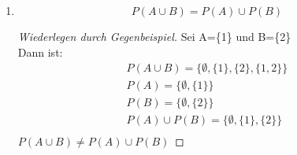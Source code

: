 \documentclass{article}
\begin{document}
\begin{enumerate}[label=\arabic*)]
\begin{enumerate}[label=\alph*)]
\begin{proof}[Beweis durch Fallunterscheidung]
                        Fall 2: $A = B$
                        \begin{gather*}
                            A \cap B = A = B \\
                            P(A \cap B) = P(A) = P(B)
                            = P(A) \cap P(B)
                        \end{gather*} \hfill \checkmark

                        Fall 3: $(A \cap B) \subset A \wedge (A \cap B) \subset B$
                        \begin{gather*}
                            P(A \cap B) = \{C |C \subset A \cap B\} \\
                            P(A) = \{A^{*} | A^{*} \subset A \} \\
                            P(B) = \{B^{*} | B \subset B \} \\
                        \end{gather*}


                    \end{proof}
                    \pagebreak
              \item \begin{equation}
                        P(A \cup B) =P(A) \cup P(B)
                    \end{equation}
                    \begin{proof}[Wiederlegen durch Gegenbeispiel]
                        Sei A=\{1\} und B=\{2\}\\
                        Dann ist:
                        \begin{gather*}
                            P(A \cup B) = \{\emptyset, \{1\},\{2\},\{1,2\}\} \\
                            P(A) = \{\emptyset, \{1\}\}                      \\
                            P(B) = \{\emptyset, \{2\}\}                      \\
                            P(A) \cup P(B) = \{\emptyset, \{1\}, \{2\}\}     \\
                        \end{gather*}
                        $P(A \cup B) \not= P(A) \cup P(B) $
                    \end{proof}
          \end{enumerate}


\end{enumerate}
\end{document}
